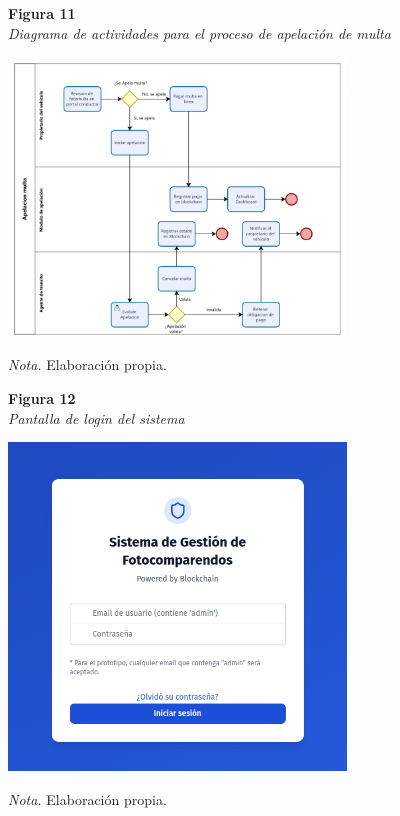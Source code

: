 \begin{figure}[htbp]
    \begin{flushleft}
        \textbf{Figura 11}\\
        \textit{Diagrama de actividades para el proceso de apelación de multa}
    \end{flushleft}
    \centering
    \includegraphics[width=0.8\textwidth]{Images/ActApelacion.png}
    \vspace{0.5em}
    \begin{flushleft}
        \textit{Nota.} Elaboración propia.
    \end{flushleft}
    \label{fig:diagrama_apelacion_2}
\end{figure}

\begin{figure}[htbp]
    \begin{flushleft}
        \textbf{Figura 12}\\
        \textit{Pantalla de login del sistema}
    \end{flushleft}
    \centering
    \includegraphics[width=0.8\textwidth]{Images/UI1.png}
    \vspace{0.5em}
    \begin{flushleft}
        \textit{Nota.} Elaboración propia.
    \end{flushleft}
    \label{fig:login}
\end{figure}

